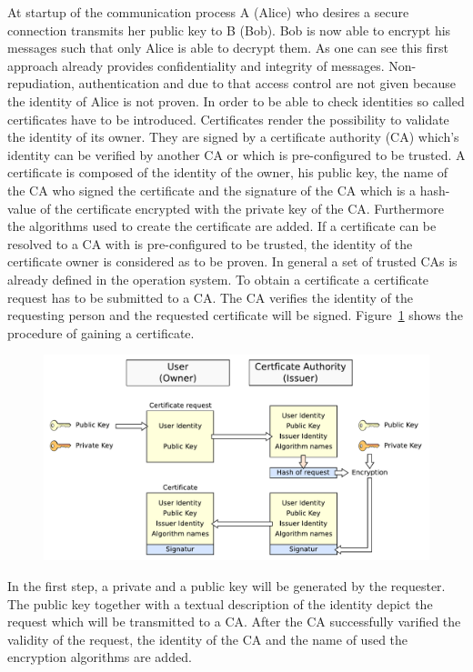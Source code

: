 At startup of the communication process A (Alice) who desires a secure connection transmits her public key to B (Bob).
Bob is now able to encrypt his messages such that only Alice is able to decrypt them.
As one can see this first approach already provides confidentiality and integrity of messages.
%
Non-repudiation, authentication and due to that access control are not given because the identity of Alice is not proven.
In order to be able to check identities so called certificates have to be introduced.
Certificates render the possibility to validate the identity of its owner. They are signed by a certificate authority (CA) which's identity can be verified by another CA or which is  pre-configured to be trusted.
A certificate is composed of the identity of the owner, his public key, the name of the CA who signed the certificate and the signature of the CA which is a hash-value of the certificate encrypted with the private key of the CA. 
Furthermore the algorithms used to create the certificate are added.
If a certificate can be resolved to a CA with is pre-configured to be trusted, the identity of the certificate owner is considered as to be proven. 
In general a set of trusted CAs is already defined in the operation system.
To obtain a certificate a certificate request has to be submitted to a CA.
The CA verifies the identity of the requesting person and the requested certificate will be signed.
Figure~\ref{fig:certificate_request} shows the procedure of gaining a certificate.
\begin{figure}[htb]
	\centering%
 	\includegraphics[width=13cm]{tex_tls_echoservice/certificates.pdf}
	\label{fig:certificate_request}
\end{figure}
In the first step, a private and a public key will be generated by the requester. The public key together with a textual description of the identity  depict the request which will be transmitted to a CA. After the CA successfully varified the validity of the request, the identity of the CA and the name of used the encryption algorithms are added.
